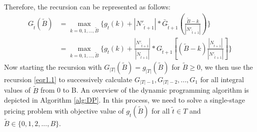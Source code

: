 \documentclass[sigconf,authordraft]{acmart}
\begin{document}
Therefore, the recursion can be represented as follows:
\begin{equation}\label{eqr1.1}
\begin{aligned}
    G_{\tilde{t}}(\tilde{B})&=\max_{k=0,1,...,\tilde{B}}\{g_{\tilde{t}}(k)+|N'_{\tilde{t}+1}|*\bar G_{\tilde{t}+1}(\frac{\tilde{B}-k}{|N'_{\tilde{t}+1}|})\}\\
    &=\max_{k=0,1,...,\tilde{B}}\{g_{\tilde{t}}(k)+\frac{|N'_{\tilde{t}+1}|}{|N_{\tilde{t}+1}|}* G_{\tilde{t}+1}[(\tilde{B}-k)\frac{|N_{\tilde{t}+1}|}{|N'_{\tilde{t}+1}|}]\}
\end{aligned}
\end{equation}
Now starting the recursion with $G_{|T|}(\tilde{B})=g_{|T|}(\tilde{B})$ for $\tilde{B} \ge 0$, we then use the recursion \eqref{eqr1.1} to successively calculate $G_{|T|-1},G_{|T|-2},...,G_1$ for all integral values of $\tilde{B}$ from 0 to B. An overview of the dynamic programming algorithm is depicted in Algorithm \ref{alg:DP}. In this process, we need to solve a single-stage pricing problem with objective value of $g_{\tilde{t}}(\tilde{B})$ for all $\tilde{t}\in T$ and $\tilde{B}\in \{0,1,2,...,B\}$. 
\end{document}
